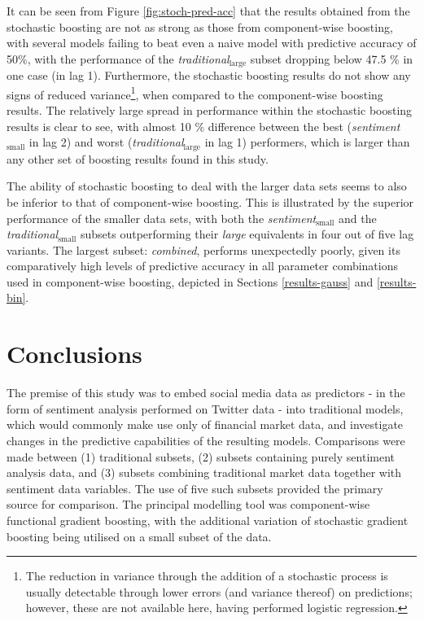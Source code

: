 \documentclass{article}
\begin{document}
It can be seen from Figure \ref{fig:stoch-pred-acc} that the results obtained from the stochastic boosting are not as strong as those from component-wise boosting, with several models failing to beat even a naive model with predictive accuracy of 50\%, with the performance of the \emph{traditional$_{\text{large}}$} subset dropping below 47.5 \% in one case (in lag 1). Furthermore, the stochastic boosting results do not show any signs of reduced variance\footnote{The reduction in variance through the addition of a stochastic process is usually detectable through lower errors (and variance thereof) on predictions; however, these are not available here, having performed logistic regression.}, when compared to the component-wise boosting results. The relatively large spread in performance within the stochastic boosting results is clear to see, with almost 10 \% difference between the best (\emph{sentiment$_{\text{small}}$} in lag 2) and worst (\emph{traditional$_{\text{large}}$} in lag 1) performers, which is larger than any other set of boosting results found in this study.

The ability of stochastic boosting to deal with the larger data sets seems to also be inferior to that of component-wise boosting. This is illustrated by the superior performance of the smaller data sets, with both the \emph{sentiment$_{\text{small}}$} and the \emph{traditional$_{\text{small}}$} subsets outperforming their \emph{large} equivalents in four out of five lag variants. The largest subset: \emph{combined}, performs unexpectedly poorly, given its comparatively high levels of predictive accuracy in all parameter combinations used in component-wise boosting, depicted in Sections \ref{results-gauss} and \ref{results-bin}.

\null\newpage

\pagebreak

\section{Conclusions \label{results-summary} \label{conclusions} \label{results-summary}}
\label{sec-7}

The premise of this study was to embed social media data as predictors - in the form of sentiment analysis performed on Twitter data - into traditional models, which would commonly make use only of financial market data, and investigate changes in the predictive capabilities of the resulting models. Comparisons were made between (1) traditional subsets, (2) subsets containing purely sentiment analysis data, and (3) subsets combining traditional market data together with sentiment data variables. The use of five such subsets provided the primary source for comparison. The principal modelling tool was component-wise functional gradient boosting, with the additional variation of stochastic gradient boosting being utilised on a small subset of the data.
\end{document}
